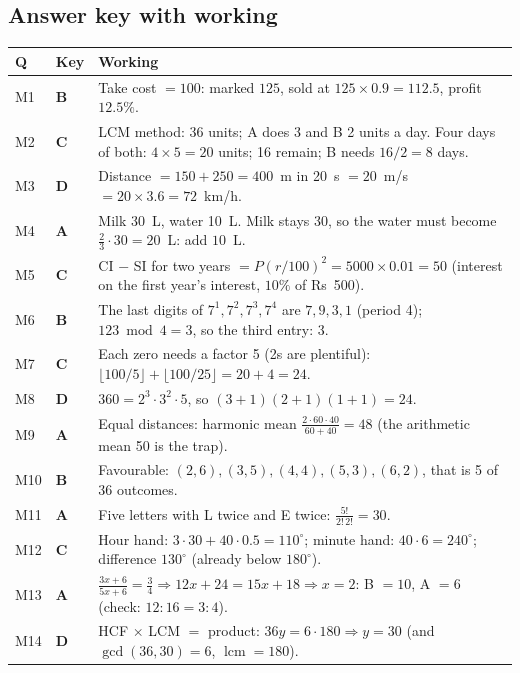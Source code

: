 \documentclass[10pt,a4paper,openany,oneside]{report}
\begin{document}
\subsection*{Answer key with working}
\begin{center}\small
\begin{xltabular}{\textwidth}{@{}L{0.95cm}L{0.7cm}Y@{}}
\toprule
\textbf{Q} & \textbf{Key} & \textbf{Working}\\
\midrule\endhead
M1 & \textbf{B} & Take cost $=100$: marked $125$, sold at $125\times0.9=112.5$, profit $12.5\%$.\\
M2 & \textbf{C} & LCM method: 36 units; A does 3 and B 2 units a day. Four days of both: $4\times5=20$ units; 16 remain; B needs $16/2=8$ days.\\
M3 & \textbf{D} & Distance $=150+250=400$~m in 20~s $=20$~m/s $=20\times3.6=72$~km/h.\\
M4 & \textbf{A} & Milk 30~L, water 10~L. Milk stays 30, so the water must become $\frac23\cdot30=20$~L: add $10$~L.\\
M5 & \textbf{C} & CI $-$ SI for two years $=P(r/100)^2=5000\times0.01=50$ (interest on the first year's interest, $10\%$ of Rs~500).\\
M6 & \textbf{B} & The last digits of $7^1,7^2,7^3,7^4$ are $7,9,3,1$ (period 4); $123\bmod4=3$, so the third entry: $3$.\\
M7 & \textbf{C} & Each zero needs a factor 5 (2s are plentiful): $\lfloor100/5\rfloor+\lfloor100/25\rfloor=20+4=24$.\\
M8 & \textbf{D} & $360=2^3\cdot3^2\cdot5$, so $(3+1)(2+1)(1+1)=24$.\\
M9 & \textbf{A} & Equal distances: harmonic mean $\frac{2\cdot60\cdot40}{60+40}=48$ (the arithmetic mean 50 is the trap).\\
M10 & \textbf{B} & Favourable: $(2,6),(3,5),(4,4),(5,3),(6,2)$, that is 5 of 36 outcomes.\\
M11 & \textbf{A} & Five letters with L twice and E twice: $\frac{5!}{2!\,2!}=30$.\\
M12 & \textbf{C} & Hour hand: $3\cdot30+40\cdot0.5=110^\circ$; minute hand: $40\cdot6=240^\circ$; difference $130^\circ$ (already below $180^\circ$).\\
M13 & \textbf{A} & $\frac{3x+6}{5x+6}=\frac34\Rightarrow12x+24=15x+18\Rightarrow x=2$: B $=10$, A $=6$ (check: $12:16=3:4$).\\
M14 & \textbf{D} & HCF $\times$ LCM $=$ product: $36y=6\cdot180\Rightarrow y=30$ (and $\gcd(36,30)=6$, $\operatorname{lcm}=180$).\\

\end{xltabular}
\end{center}
\end{document}
